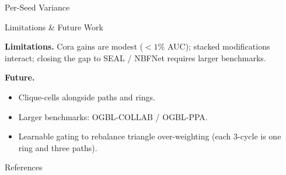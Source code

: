 \documentclass[final]{beamer}
\newlength{\colwidth}
\newlength{\marginwidth}
\newcommand{\marginspacer}{
  \begin{column}{\marginwidth}
\end{column}}
\begin{document}
\begin{frame}[t]
\begin{columns}[t]
\begin{column}{\colwidth}
\begin{block}{Per-Seed Variance}
      \end{block}

      \medskip

      \begin{block}{Limitations \& Future Work}

        \textbf{Limitations.} Cora gains are modest ($<\!1\%$ AUC);
        stacked modifications interact; closing the gap to SEAL /
        NBFNet requires larger benchmarks.

        \medskip
        \textbf{Future.}
      \begin{itemize}\setlength{\itemsep}{0.15em}
          \item Clique-cells alongside paths and rings.
          \item Larger benchmarks: OGBL-COLLAB / OGBL-PPA.
          \item Learnable gating to rebalance triangle over-weighting
            (each 3-cycle is one ring and three paths).
        \end{itemize}

      \end{block}

      \medskip

      \begin{block}{References}

        \nocite{*}
        \renewcommand{\bibsep}{1pt}
        {\fontsize{18pt}{22pt}\selectfont
        }

      \end{block}

    \end{column}

    \marginspacer
  \end{columns}
\end{frame}
\end{document}
